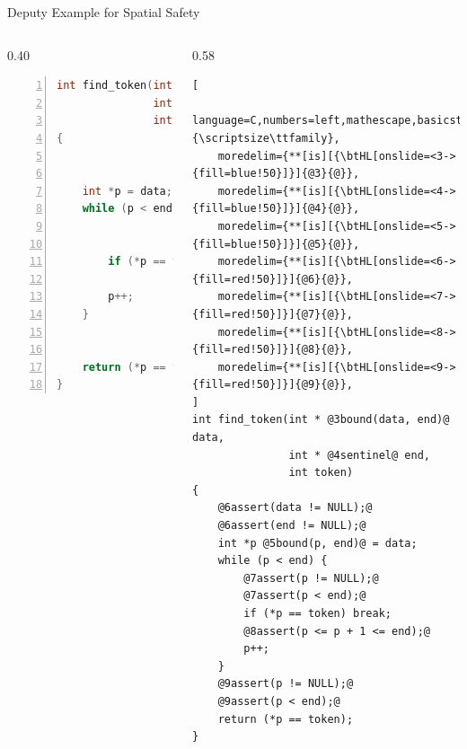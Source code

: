 \documentclass[aspectratio=169]{beamer}
\begin{document}
\begin{frame}[fragile]{Deputy Example for Spatial Safety}
\begin{columns}[T]
\begin{column}{0.40\textwidth}
\begin{lstlisting}[language=C,numbers=left,mathescape,basicstyle={\scriptsize\ttfamily}]
int find_token(int *data,
               int *end,
               int token)
{


    int *p = data;
    while (p < end) {


        if (*p == token) break;

        p++;
    }


    return (*p == token);
}
\end{lstlisting}
\end{column}


\pause

\begin{column}{0.58\textwidth}
\begin{lstlisting}[
    language=C,numbers=left,mathescape,basicstyle={\scriptsize\ttfamily},
    moredelim={**[is][{\btHL[onslide=<3->{fill=blue!50}]}]{@3}{@}},
    moredelim={**[is][{\btHL[onslide=<4->{fill=blue!50}]}]{@4}{@}},
    moredelim={**[is][{\btHL[onslide=<5->{fill=blue!50}]}]{@5}{@}},
    moredelim={**[is][{\btHL[onslide=<6->{fill=red!50}]}]{@6}{@}},
    moredelim={**[is][{\btHL[onslide=<7->{fill=red!50}]}]{@7}{@}},
    moredelim={**[is][{\btHL[onslide=<8->{fill=red!50}]}]{@8}{@}},
    moredelim={**[is][{\btHL[onslide=<9->{fill=red!50}]}]{@9}{@}},
]
int find_token(int * @3bound(data, end)@ data,
               int * @4sentinel@ end,
               int token)
{
    @6assert(data != NULL);@
    @6assert(end != NULL);@
    int *p @5bound(p, end)@ = data;
    while (p < end) {
        @7assert(p != NULL);@
        @7assert(p < end);@
        if (*p == token) break;
        @8assert(p <= p + 1 <= end);@
        p++;
    }
    @9assert(p != NULL);@
    @9assert(p < end);@
    return (*p == token);
}
\end{lstlisting}
\end{column}

\end{columns}
\end{frame}
\end{document}
